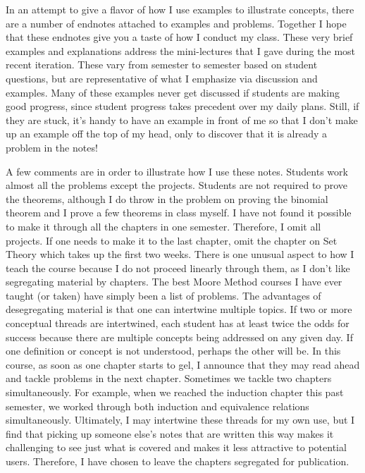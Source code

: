 \begin{annotation}
In an attempt to give a flavor of how I use examples to illustrate concepts, there are a number of endnotes attached to examples and problems.  Together I hope that these endnotes give you a taste of how I conduct my class. These very brief examples and explanations address the mini-lectures that I gave during the most recent iteration.  These vary from semester to semester based on student questions, but are representative of what I emphasize via discussion and examples.   Many of these examples never get discussed if students are making good progress, since student progress takes precedent over my daily plans.    Still, if they are stuck, it's handy to have an example in front of me so that I don't make up an example off the top of my head, only to discover that it is already a problem in the notes!

A few comments are in order to illustrate how I use these notes.   Students work almost all the problems except the projects.   Students are not required to prove the theorems, although I do throw in the problem on proving the binomial theorem and I prove a few theorems in class myself.  I have not found it possible to make it through all the chapters in one semester.  Therefore, I omit all projects.  If one needs to make it to the last chapter, omit the chapter on Set Theory which takes up the first two weeks.  There is one unusual aspect to how I teach the course  because I do not proceed linearly through them, as I don't like segregating material by chapters.  The best Moore Method courses I have ever taught (or taken) have simply been a list of problems.  The advantages of desegregating material is that one can intertwine multiple topics.  If two or more conceptual threads are intertwined, each student has at least twice the odds for success because there are  multiple concepts being addressed on any given day.  If one definition or concept is not understood, perhaps the other will be.  In this course, as soon as one chapter starts to gel, I announce that they may read ahead and tackle problems in the next chapter. Sometimes we tackle two chapters simultaneously.  For example, when we reached the induction chapter this past semester, we worked through both induction and equivalence relations simultaneously. Ultimately, I may intertwine these threads for my own use, but I find that picking up someone else's notes that are written this way makes it challenging to see just what is covered and makes it less attractive to potential users.  Therefore, I have chosen to leave the chapters segregated for publication.


\end{annotation}
